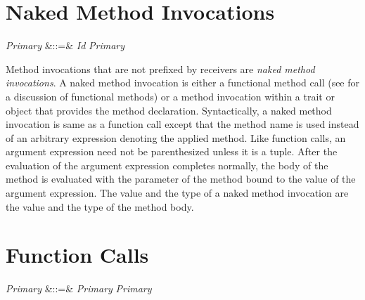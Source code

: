 %
%
%
%

\section{Naked Method Invocations}

\begin{Grammar}
\emph{Primary} &::=& \emph{Id} \emph{Primary}\\

\end{Grammar}

Method invocations that are not prefixed by receivers are \emph{naked
  method invocations}.  A naked method invocation is either a
functional method call (see  for a discussion of
functional methods) or a method invocation within a trait or object
that provides the method declaration.  Syntactically, a naked method
invocation is same as a function call except that the method name is
used instead of an arbitrary expression denoting the applied method.
Like function calls, an argument expression need not be parenthesized
unless it is a tuple.  After the evaluation of the argument expression
completes normally, the body of the method is evaluated with the parameter
of the method bound to the value of the argument expression.  The value
and the type of a naked method invocation are the value and the type
of the method body.


\section{Function Calls}

\begin{Grammar}
\emph{Primary} &::=& \emph{Primary} \emph{Primary}\\
\end{Grammar}


